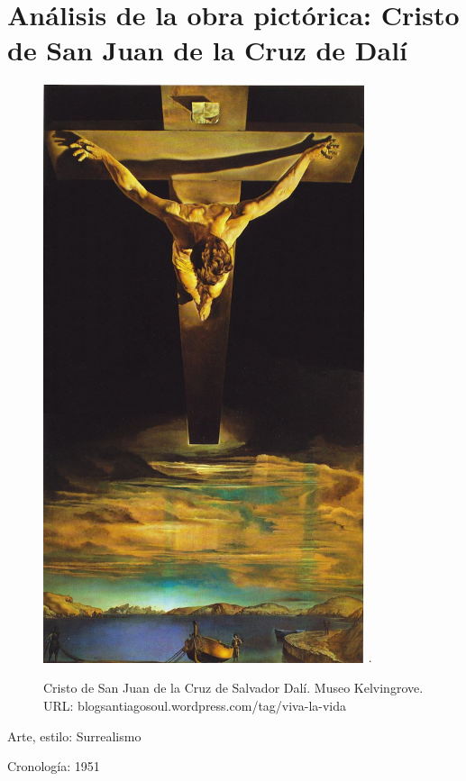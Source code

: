 \section{Análisis de la obra pictórica: Cristo de San Juan de la Cruz de Dalí}

\begin{figure}[ht!]
    \centering
    \includegraphics[width=0.84\textwidth,natwidth=610,natheight=642]{dali.jpg}
   .\caption{Cristo de San Juan de la Cruz de Salvador Dalí. Museo Kelvingrove. URL: blogsantiagosoul.wordpress.com/tag/viva-la-vida}
\end{figure}

\newpage

Arte, estilo: Surrealismo

Cronología: 1951

